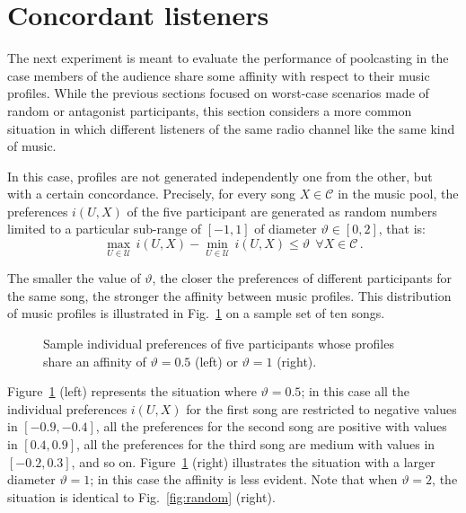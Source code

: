 
\section{Concordant listeners} %
\label{sub:concordance}

The next experiment is meant to evaluate the performance of poolcasting in the case members of the audience share some affinity with respect to their music profiles.
While the previous sections focused on worst-case scenarios made of random or antagonist participants, this section considers a more common situation in which different listeners of the same radio channel like the same kind of music.

In this case, profiles are not generated independently one from the other, but with a certain concordance.
Precisely, for every song $X \in \mathcal{C}$ in the music pool, the  preferences $i(U,X)$ of the five participant are generated as random numbers limited to a particular sub-range of $[-1,1]$ of diameter $\vartheta \in [0,2]$, that is:
\begin{equation*}
        \max_{U \in \mathcal{U}}\,i(U,X) - \min_{U \in \mathcal{U}}\,i(U,X) \leqslant \vartheta \,\; \forall X \in \mathcal{C}\,.
\end{equation*}

The smaller the value of $\vartheta$, the closer the preferences of different participants for the same song, the stronger the affinity between music profiles. 
This distribution of music profiles is illustrated in Fig.~\ref{fig:bump} on a sample set of ten songs.
%
\begin{figure}[bthp]
\centering \setlength{\abovecaptionskip}{3pt}
\caption{Sample individual preferences of five participants whose profiles share an affinity of $\vartheta = 0.5$ (left) or $\vartheta = 1$ (right).}
\label{fig:bump}
\end{figure}

Figure~\ref{fig:bump} (left) represents the situation where $\vartheta = 0.5$; in this case all the individual preferences $i(U,X)$ for the first song are restricted to negative values in $[-0.9,-0.4]$, all the preferences for the second song are positive with values in $[0.4,0.9]$, all the preferences for the third song are medium with values in $[-0.2,0.3]$, and so on.
Figure~\ref{fig:bump} (right) illustrates the situation with a larger diameter $\vartheta = 1$; in this case the affinity is less evident. Note that when $\vartheta = 2$, the situation is identical to Fig.~\ref{fig:random} (right).

